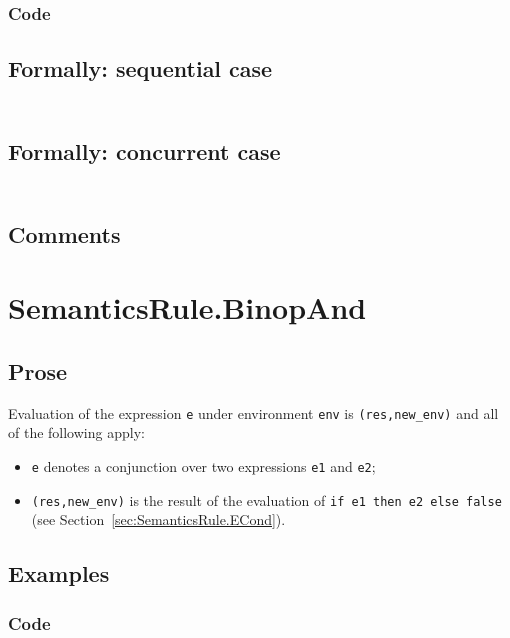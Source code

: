 \documentclass{book}
\begin{document}
  \subsubsection{Code}

  \subsection{Formally: sequential case}
  \begin{align}
  \end{align} 

  \subsection{Formally: concurrent case}
  \begin{align}
  \end{align} 

  \subsection{Comments}

\section{SemanticsRule.BinopAnd \label{sec:SemanticsRule.BinopAnd}}

  \subsection{Prose}

  Evaluation of the expression \texttt{e} under environment \texttt{env} is
  \texttt{(res,new\_env)} and all of the following apply:
  \begin{itemize}
  \item \texttt{e} denotes a conjunction over two expressions \texttt{e1} and \texttt{e2};
  \item \texttt{(res,new\_env)} is the result of the evaluation of \texttt{if
e1 then e2 else false} (see Section~\ref{sec:SemanticsRule.ECond}).
  \end{itemize}

  \subsection{Examples}

  \subsubsection{Code}
\end{document}
